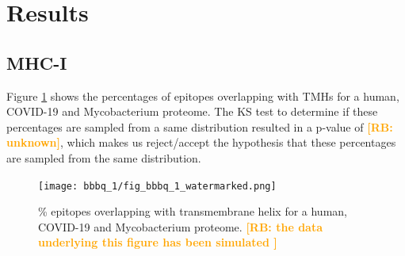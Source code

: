 \documentclass{article}
\newcommand{\frans}[1]{\textcolor{blue}{\textbf{[FB: #1]}}}
\newcommand{\richel}[1]{\textcolor{orange}{\textbf{[RB: #1]}}}
\begin{document}

\section{Results}


\subsection{MHC-I}

Figure \ref{fig:1} shows the percentages of epitopes overlapping 
with TMHs for a human, COVID-19 and Mycobacterium proteome.
The KS test to determine if these percentages are sampled from
a same distribution resulted in a p-value of \richel{unknown},
which makes us reject/accept the hypothesis that these percentages
are sampled from the same distribution. 

\begin{figure}[!htbp]
  \texttt{[image: bbbq\_1/fig\_bbbq\_1\_watermarked.png]}
  \caption{
    \% epitopes overlapping with transmembrane helix
    for a human, COVID-19 and Mycobacterium proteome.
    \richel{
      the data underlying this figure has been simulated
    }
  }
  \label{fig:1}
\end{figure}

\end{document}
